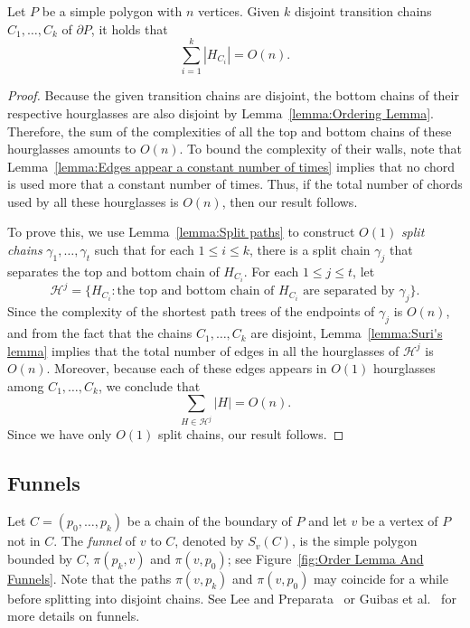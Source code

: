 \documentclass[a4paper,UKenglish]{lipics}
\newcommand{\fn}[2]{\ensuremath{S_{\scriptscriptstyle #1}(#2)}}
\newcommand{\p}[2]{\ensuremath{\pi(#1, #2)}}
\begin{document}
\begin{lemma}\label{lemma:Bounding complexity of hourglasses}
Let $P$ be a simple polygon with $n$ vertices.
Given $k$ disjoint transition chains $C_1, \ldots, C_k$  of $\partial P$, it holds that  $$\sum_{i=1}^k |H_{C_i}| = O(n).$$
\end{lemma}
\begin{proof}

Because the given transition chains are disjoint, the bottom chains of their respective hourglasses are also disjoint by Lemma~\ref{lemma:Ordering Lemma}. Therefore, the sum of the complexities of all the top and bottom chains of these hourglasses amounts to $O(n)$. 
To bound the complexity of their walls, note that
Lemma~\ref{lemma:Edges appear a constant number of times} implies that no chord is used more that a constant number of times. Thus, if the total number of chords used by all these hourglasses is $O(n)$, then our result follows. 

To prove this, we use Lemma~\ref{lemma:Split paths} to construct $O(1)$ \emph{split chains} $\gamma_1, \ldots, \gamma_t$ such that for each $1\leq i\leq k$, there is a split chain $\gamma_j$ that separates the top and bottom chain of $H_{C_i}$.
For each $1\leq j\leq t$, let $$\mathcal H^j = \{H_{C_i} : \text{the top and bottom chain of $H_{C_i}$ are separated by }\gamma_j\}.$$
Since the complexity of the shortest path trees of the endpoints of $\gamma_j$ is $O(n)$,
and from the fact that the chains $C_1, \ldots, C_k$ are disjoint,  Lemma~\ref{lemma:Suri's lemma} implies that
the total number of edges in all the hourglasses of $\mathcal H^j$ is $O(n)$. Moreover, because each of these edges appears in $O(1)$ hourglasses among $C_1, \ldots, C_k$, we conclude that 
$$\sum_{H \in \mathcal H^j } |H| = O(n).$$
Since we have only $O(1)$ split chains, our result follows.
\end{proof}

\subsection{Funnels}

Let $C = (p_0, \ldots, p_k)$ be a chain of the boundary of $P$ and let $v$ be a vertex of $P$ not in $C$.
The \emph{funnel} of $v$ to $C$, denoted by $\fn{v}{C}$, is the simple polygon bounded by $C$, $\p{p_k}{v}$ and $\p{v}{p_0}$; see Figure~\ref{fig:Order Lemma And Funnels}. 
Note that the paths $\p{v}{p_k}$ and $\p{v}{p_0}$ may coincide for a while before splitting into disjoint chains. 
See Lee and Preparata~\cite{lee1984euclidean} or Guibas et al.~\cite{guibasShortestPathTree} for more details on funnels.
\end{document}
